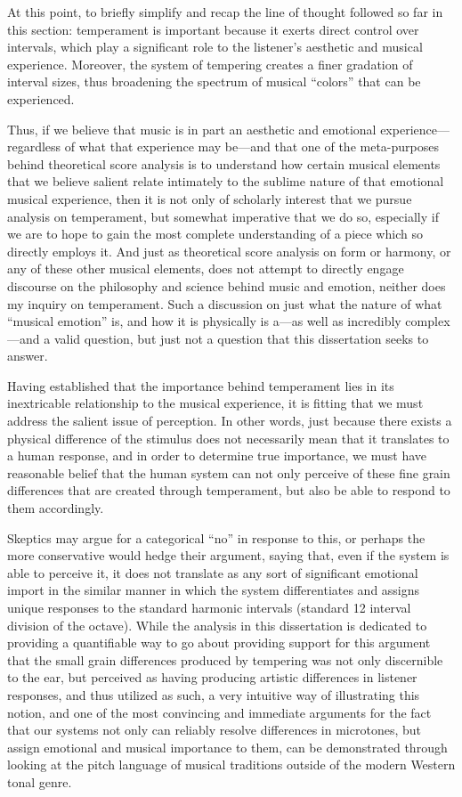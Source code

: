 At this point, to briefly simplify and recap the line of thought
followed so far in this section: temperament is important because it
exerts direct control over intervals, which play a significant role to
the listener's aesthetic and musical experience. Moreover, the system of
tempering creates a finer gradation of interval sizes, thus broadening
the spectrum of musical ``colors'' that can be experienced.

Thus, if we believe that music is in part an aesthetic and emotional
experience---regardless of what that experience may be---and that one of
the meta-purposes behind theoretical score analysis is to understand how
certain musical elements that we believe salient relate intimately to
the sublime nature of that emotional musical experience, then it is not
only of scholarly interest that we pursue analysis on temperament, but
somewhat imperative that we do so, especially if we are to hope to gain
the most complete understanding of a piece which so directly employs it.
And just as theoretical score analysis on form or harmony, or any of
these other musical elements, does not attempt to directly engage
discourse on the philosophy and science behind music and emotion,
neither does my inquiry on temperament. Such a discussion on just what
the nature of what ``musical emotion'' is, and how it is physically is
a---as well as incredibly complex---and a valid question, but just not a
question that this dissertation seeks to answer.

Having established that the importance behind temperament lies in its
inextricable relationship to the musical experience, it is fitting that
we must address the salient issue of perception. In other words, just
because there exists a physical difference of the stimulus does not
necessarily mean that it translates to a human response, and in order to
determine true importance, we must have reasonable belief that the human
system can not only perceive of these fine grain differences that are
created through temperament, but also be able to respond to them
accordingly.

Skeptics may argue for a categorical ``no'' in response to this, or
perhaps the more conservative would hedge their argument, saying that,
even if the system is able to perceive it, it does not translate as any
sort of significant emotional import in the similar manner in which the
system differentiates and assigns unique responses to the standard
harmonic intervals (standard 12 interval division of the octave). While
the analysis in this dissertation is dedicated to providing a
quantifiable way to go about providing support for this argument that
the small grain differences produced by tempering was not only
discernible to the ear, but perceived as having producing artistic
differences in listener responses, and thus utilized as such, a very
intuitive way of illustrating this notion, and one of the most
convincing and immediate arguments for the fact that our systems not
only can reliably resolve differences in microtones, but assign
emotional and musical importance to them, can be demonstrated through
looking at the pitch language of musical traditions outside of the
modern Western tonal genre.


